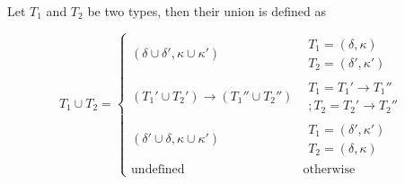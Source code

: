 \documentclass[acmsmall,sigplan]{acmart}
\begin{document}
\begin{definition}
  	Let $T_1$ and $T_2$ be two types, then their union is defined as

  \[
T_1\cup T_2=
    \begin{cases}
      (\delta\cup\delta',\kappa\cup\kappa') & \begin{array}{l}
                                                T_1=(\delta,\kappa) \\
      T_2=(\delta',\kappa') \end{array} \\[3mm]
       (T_1'\cup T_2')\rightarrow (T_1''\cup T_2'') &
       \begin{array}{l} T_1=T_1'\rightarrow T_1'' \\;T_2=T_2'\rightarrow
       T_2''  \end{array}\\[3mm]
       (\delta' \cup \delta, \kappa \cup \kappa') & \begin{array}{l}
                                                      T_1 =
                                                      (\delta',\kappa') \\
                                                      T_2 =
                                                      (\delta,\kappa) \end{array}
                                                    \\[3mm]
       \text{undefined} & \text{otherwise}
    \end{cases}
\]
\end{definition}
\end{document}
